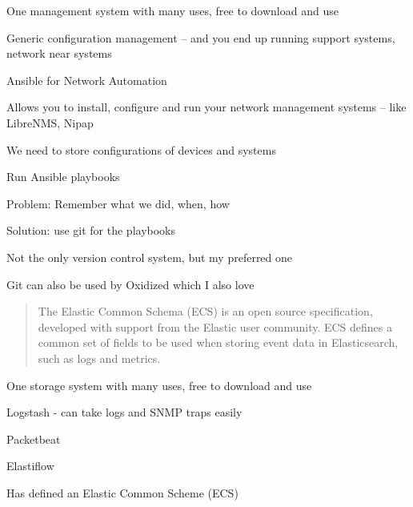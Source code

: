 \documentclass[Screen16to9,17pt]{foils}
\begin{document}
One management system with many uses, free to download and use
\begin{list2}
\item Generic configuration management -- and you end up running support systems, network near systems
\item Ansible for Network Automation\\
\item Allows you to install, configure and run your network management systems -- like LibreNMS, Nipap
\end{list2}



\begin{list2}
\item We need to store configurations of devices and systems
\item Run Ansible playbooks
\item Problem: Remember what we did, when, how
\item Solution: use git for the playbooks
\item Not the only version control system, but my preferred one
\item Git can also be used by Oxidized which I also love 
\end{list2}





\begin{quote}
The Elastic Common Schema (ECS) is an open source specification, developed with support from the Elastic user community. ECS defines a common set of fields to be used when storing event data in Elasticsearch, such as logs and metrics.
\end{quote}

One storage system with many uses, free to download and use
\begin{list2}
\item Logstash - can take logs and SNMP traps easily
\item Packetbeat 
\item Elastiflow
\item Has defined an Elastic Common Scheme (ECS)\\
\end{list2}
\end{document}
